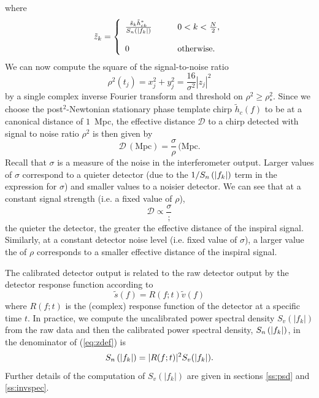 where
\begin{equation}
\label{eq:ztildedef}
\tilde{z}_k = \left\{
\begin{array}{ll}
\frac{\tilde{s}_k \tilde{h}_{ck}^\ast}{S_n\left(\left|f_{k}\right|\right)} 
  \quad\quad & 0 < k < \frac{N}{2},\\
\\
0 & \mathrm{otherwise}.
\end{array}
\right.
\end{equation}
We can now compute the square of the signal-to-noise ratio
\begin{equation}
\rho^2(t_j) = x_j^2 + y_j^2 = \frac{16}{\sigma^2}|z_j|^2
\end{equation}
by a single complex inverse Fourier transform and threshold on $\rho^2 \ge
\rho^2_\ast$.  Since we choose the post$^2$-Newtonian stationary phase
template chirp $\tilde{h}_c(f)$ to be at a canonical distance of $1$~Mpc, the
effective distance $\mathcal{D}$ to a chirp detected with signal to noise
ratio $\rho^2$ is then given by
\begin{equation}
\mathcal{D} \,(\mathrm{Mpc})= \frac{\sigma}{\rho} \,(\mathrm{Mpc}.
\label{eq:effdistdef}
\end{equation}
Recall that $\sigma$ is a measure of the noise in the interferometer output.
Larger values of $\sigma$ correspond to a quieter detector (due to the
$1/S_n\left(\left|f_{k}\right|\right)$ term in the expression for $\sigma$) and smaller values to a
noisier detector. We can see that at a constant signal strength (i.e. a fixed
value of $\rho$),
\begin{equation}
\mathcal{D} \propto \frac{\sigma};
\end{equation}
the quieter the detector, the greater the effective distance of the inspiral
signal. Similarly, at a constant detector noise level (i.e. fixed value of
$\sigma$), a larger value the of $\rho$ corresponds to a smaller effective
distance of the inspiral signal.

The calibrated detector output is related to the raw detector output by the
detector response function according to
\begin{equation}
\tilde{s}(f) = R(f;t) \tilde{v}(f)
\end{equation}
where $R(f;t)$ is the (complex) response function of the detector at a
specific time $t$\cite{Adhikari:2003}. In practice, we compute the uncalibrated
power spectral density $S_v(|f_k|)$ from the raw data and then the calibrated
power spectral density, $S_n\left(\left|f_{k}\right|\right)$, in the denominator of (\ref{eq:zdef}) is
\begin{equation}
S_n\left(\left|f_{k}\right|\right) = |R(f;t)|^2 S_v(|f_k|).
\end{equation}
Further details of the computation of $S_v(|f_k|)$ are given in sections
\ref{ss:psd} and \ref{ss:invspec}.

